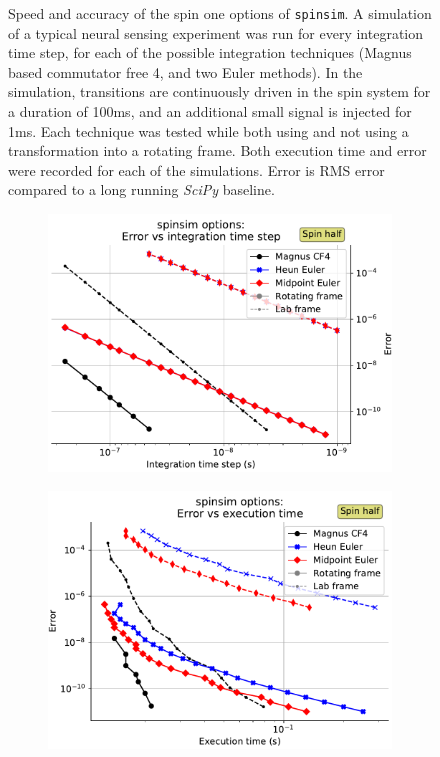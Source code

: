 \documentclass{jors}
\begin{document}
\begin{figure}[h!]
			\caption{Speed and accuracy of the spin one options of \texttt{spinsim}. A simulation of a typical neural sensing experiment was run for every integration time step, for each of the possible integration techniques (Magnus based commutator free 4, and two Euler methods). In the simulation, transitions are continuously driven in the spin system for a duration of 100ms, and an additional small signal is injected for 1ms. Each technique was tested while both using and not using a transformation into a rotating frame. Both execution time and error were recorded for each of the simulations. Error is RMS error compared to a long running \emph{SciPy} baseline.}
			\label{fig:benchmark_spin_one}
		\end{figure}

		\begin{figure}[h!]
			\begin{subfigure}[b]{0.475\textwidth}
				\includegraphics[scale=0.475]{benchmark_spin_half_step_error.pdf}
				\caption{}
				\label{fig:benchmark_spin_half_step_error}
			\end{subfigure}
			\hfill
			\begin{subfigure}[b]{0.475\textwidth}
				\includegraphics[scale=0.475]{benchmark_spin_half_execution_error.pdf}

\end{subfigure}
\end{figure}
\end{document}
